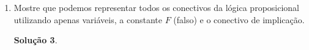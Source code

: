 \documentclass[11pt,a4paper]{report}
\newtheorem*{Solucao}{Solu\c{c}\~ao}
\begin{document}
\begin{enumerate}
\begin{enumerate}
\begin{Solucao}
\[\begin{array}{lc}
                      (A \lor B) \land \neg (A \land B)
                    \end{array}
                    \]
                  \end{Solucao}
		\item $((A\rightarrow B)\rightarrow A)\rightarrow
                  A\equiv T$
                  \begin{Solucao}
                    \[
                    \begin{array}{lc}
                    ((A\rightarrow B)\rightarrow A)\rightarrow A &
                    \equiv \\
                    ((\neg A \lor B) \to A) \to A & \equiv \\
                    (\neg (\neg A \lor B) \lor A) \to A & \equiv \\
                    \neg (\neg (\neg A \lor B) \lor A) \lor A & \equiv
                    \\
                    \neg ((\neg \neg A \land \neg B) \lor A) \lor A &
                    \equiv\\
                    (\neg (A \land \neg B) \land \neg A) \lor A &
                    \equiv \\
                    ((\neg A \lor \neg \neg B) \land \neg A) \lor A &
                    \equiv \\
                    ((\neg A \lor B) \land \neg A) \lor A & \equiv \\
                    ((\neg A \land \neg A) \lor (\neg A \lor B)) \lor
                    A & \equiv \\
                    \neg A \lor (\neg A \lor B) \lor A & \equiv \\
                    \neg A \lor A \lor (\neg A \lor B) & \equiv \\
                    T \lor (\neg A \lor B) & \equiv \\
                    T
                    \end{array}
                    \]
                  \end{Solucao}
	\end{enumerate}
        \item Mostre que podemos representar todos os conectivos da
          l\'ogica proposicional utilizando apenas vari\'aveis, a
          constante $F$ (falso) e o conectivo de implica\c{c}\~ao.
          \begin{Solucao}
            \verb| |\\
            \begin{enumerate}

\end{enumerate}
\end{Solucao}
\end{enumerate}
\end{document}

